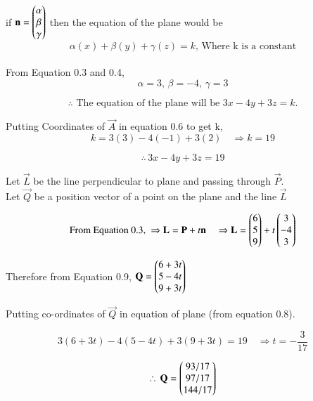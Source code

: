 \documentclass[journal]{IEEEtran}
\begin{document}
if $\mathbf{n} = \begin{pmatrix}\alpha \\ \beta \\ \gamma\end{pmatrix}$ then the equation of the plane would be
\begin{equation}
    \alpha(x) + \beta(y) + \gamma(z) = k \text{, Where k is a constant}
\end{equation}\\

From Equation 0.3 and 0.4, 
\begin{equation}
    \alpha = 3, \, \beta = -4, \, \gamma = 3
\end{equation}

\begin{equation}
\therefore
\text{ The equation of the plane will be } 3x-4y+3z = k.
\end{equation}


Putting Coordinates of $\vec{A}$ in equation 0.6 to get k,
\begin{equation}
    k=3(3) - 4(-1) + 3(2) \quad \Rightarrow k= 19
\end{equation}

\begin{equation}
\therefore \, 3x-4y+3z=19
\end{equation}

Let $\vec{L}$ be the line perpendicular to plane and passing through $\vec{P}$.\\
Let $\vec{Q}$ be a position vector of a point on the plane and the line $\vec{L}$

\begin{equation}
\text{From Equation 0.3, } \Rightarrow 
\mathbf{L} = \mathbf{P} + t\mathbf{n}
\quad \Rightarrow \mathbf{L} = \begin{pmatrix}6 \\ 5 \\ 9\end{pmatrix} + t\begin{pmatrix}3 \\ -4 \\ 3\end{pmatrix}
\end{equation}


Therefore from Equation 0.9,
$\mathbf{Q} = \begin{pmatrix}6+3t \\ 5-4t \\ 9+3t\end{pmatrix}$

Putting co-ordinates of $\vec{Q}$ in equation of plane (from equation 0.8).

\begin{equation}
    3(6+3t) - 4(5-4t) + 3(9+3t) = 19 \quad \Rightarrow t=-\dfrac{3}{17}  
\end{equation}

\begin{equation}
    \therefore \, \mathbf{Q}=\begin{pmatrix}93/17 \\ 97/17 \\ 144/17\end{pmatrix}
\end{equation}\\
\end{document}
